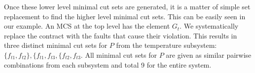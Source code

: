 Once these lower level minimal cut sets are generated, it is a matter of simple set replacement to find the higher level minimal cut sets. This can be easily seen in our example. An MCS at the top level has the element $G_t$. We systematically replace the contract with the faults that cause their violation. This results in three distinct minimal cut sets for $P$ from the temperature subsystem: $\{f_{t1}, f_{t2}\}, \{f_{t1}, f_{t3}, \{f_{t2}, f_{t3}$. All minimal cut sets for $P$ are given as similar pairwise combinations from each subsystem and total 9 for the entire system.



